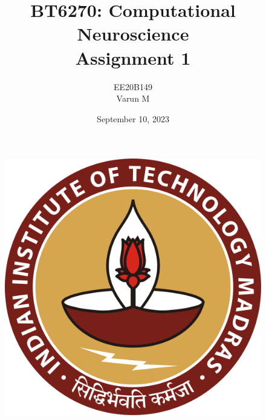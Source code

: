 \documentclass{article}
\date{September 10, 2023}
\begin{document}
\begin{figure}
\centering
\includegraphics[width=0.9\linewidth, keepaspectratio]{logo}
\end{figure}
\author{EE20B149\\Varun M}
\title{\textbf{BT6270: Computational Neuroscience\\Assignment 1\\}}
\maketitle
\newpage
\end{document}
